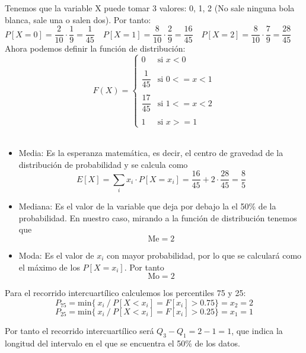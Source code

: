 \problem
\subproblem
Tenemos que la variable X puede tomar 3 valores: 0, 1, 2 (No sale ninguna bola blanca, sale una o salen dos). Por tanto: \\

$P[X = 0] = \dfrac{2}{10}\cdot\dfrac{1}{9} = \dfrac{1}{45} \quad
P[X = 1] = \dfrac{8}{10}\cdot\dfrac{2}{9} = \dfrac{16}{45} \quad 
P[X = 2] = \dfrac{8}{10}\cdot\dfrac{7}{9} = \dfrac{28}{45}$ \\

Ahora podemos definir la función de distribución: \\

$$
F(X) = \left\{
     \begin{array}{lr}
       0 & \mbox{si }  x < 0 \\
       \\
       \dfrac{1}{45} & \mbox{si }0 <= x < 1 \\
       \\
       \dfrac{17}{45}& \mbox{si }  1 <= x < 2 \\
       \\
       1 & \mbox{si } x >= 1 
     \end{array}
   \right.
$$
\\

\subproblem
\begin{itemize}
\item Media: Es la esperanza matemática, es decir, el centro de gravedad de la distribución de probabilidad y se calcula como $$E[X] = \sum_i x_i \cdot P[X = x_i] = \dfrac{16}{45} + 2\cdot \dfrac{28}{45} = \dfrac{8}{5}$$

\item Mediana: Es el valor de la variable que deja por debajo la el 50\% de la probabilidad. En nuestro caso, mirando a la función de distribución tenemos que $$ \mbox{Me} = 2 $$

\item Moda: Es el valor de $x_i$ con mayor probabilidad, por lo que se calculará como el máximo de los $P[X = x_i]$. Por tanto $$ \mbox{Mo} = 2$$
\end{itemize}

\subproblem
Para el recorrido intercuartílico calculemos los percentiles 75 y 25: \\

$$ P_{75} = \mbox{min}\{\ x_i\ /\ P[X < x_i] = F[x_i] > 0.75\} = x_2 = 2 $$
$$ P_{25} = \mbox{min}\{\ x_i\ /\ P[X < x_i] = F[x_i] > 0.25\} = x_1 = 1 $$

Por tanto el recorrido intercuartílico será $Q_3 - Q_1 = 2-1 = 1$, que indica la longitud del intervalo en el que se encuentra el 50\% de los datos.
